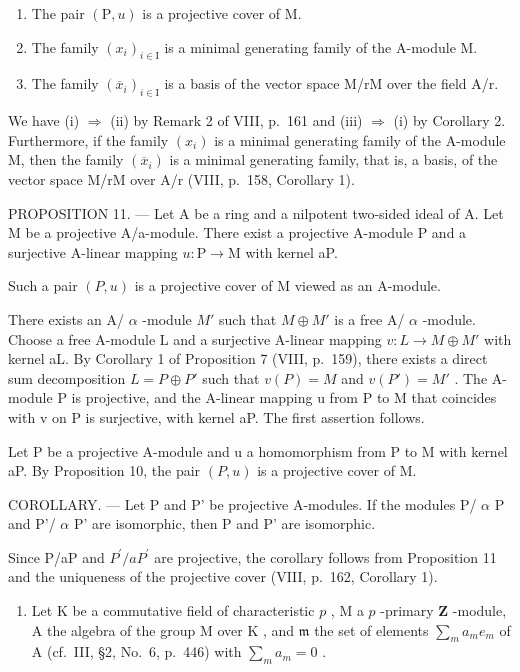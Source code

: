 \begin{enumerate}
\def\labelenumi{(\roman{enumi})}
\item
  The pair \((\mathrm{P},u)\) is a projective cover of M.
\item
  The family \((x_{i})_{i\in \mathrm{I}}\) is a minimal generating family of the A-module M.
\item
  The family \((\overline{x}_{i})_{i\in\mathrm{I}}\) is a basis of the vector space M/rM over the field A/r.
\end{enumerate}

We have (i) \(\Rightarrow\) (ii) by Remark 2 of VIII, p.~161 and (iii) \(\Rightarrow\) (i) by Corollary 2. Furthermore, if the family \((x_{i})\) is a minimal generating family of the A-module M, then the family \((\overline{x}_{i})\) is a minimal generating family, that is, a basis, of the vector space M/rM over A/r (VIII, p.~158, Corollary 1).

PROPOSITION 11. --- Let A be a ring and a nilpotent two-sided ideal of A. Let M be a projective A/a-module. There exist a projective A-module P and a surjective A-linear mapping \(u: \mathrm{P} \to \mathrm{M}\) with kernel aP.

Such a pair \((P,u)\) is a projective cover of M viewed as an A-module.

There exists an A/ \(\alpha\) -module \(M'\) such that \(M \oplus M'\) is a free A/ \(\alpha\) -module. Choose a free A-module L and a surjective A-linear mapping \(v: L \to M \oplus M'\) with kernel aL. By Corollary 1 of Proposition 7 (VIII, p.~159), there exists a direct sum decomposition \(L = P \oplus P'\) such that \(v(P) = M\) and \(v(P') = M'\) . The A-module P is projective, and the A-linear mapping u from P to M that coincides with v on P is surjective, with kernel aP. The first assertion follows.

Let P be a projective A-module and u a homomorphism from P to M with kernel aP. By Proposition 10, the pair \((P,u)\) is a projective cover of M.

COROLLARY. --- Let P and P' be projective A-modules. If the modules P/ \(\alpha\) P and P'/ \(\alpha\) P' are isomorphic, then P and P' are isomorphic.

Since P/aP and \(P^{\prime}/aP^{\prime}\) are projective, the corollary follows from Proposition 11 and the uniqueness of the projective cover (VIII, p.~162, Corollary 1).


\begin{enumerate}
\def\labelenumi{\arabic{enumi})}
\tightlist
\item
  Let \(\mathrm{K}\) be a commutative field of characteristic \(p\) , \(\mathrm{M}\) a \(p\) -primary \(\mathbf{Z}\) -module, \(\mathrm{A}\) the algebra of the group \(\mathrm{M}\) over \(\mathrm{K}\) , and \(\mathfrak{m}\) the set of elements \(\sum_{m} a_{m} e_{m}\) of \(\mathrm{A}\) (cf.~III, §2, No.~6, p.~446) with \(\sum_{m} a_{m} = 0\) .
\end{enumerate}

